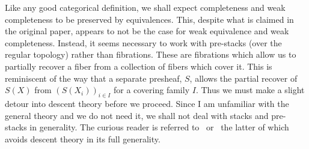 Like any good categorical definition, we shall expect completeness and
weak completeness to be preserved by equivalences. This, despite what
is claimed in the original paper, appears to not be the case for weak
equivalence and weak completeness. Instead, it seems necessary to work
with pre-stacks (over the regular topology) rather than
fibrations. These are fibrations which allow us to partially recover a
fiber from a collection of fibers which cover it. This is reminiscent
of the way that a separate presheaf, $S$, allows the partial recover
of $S(X)$ from $(S(X_i))_{i \in I}$ for a covering family $I$. Thus we
must make a slight detour into descent theory before we proceed. Since
I am unfamiliar with the general theory and we do not need it, we
shall not deal with stacks and pre-stacks in generality. The curious
reader is referred to~\citet{Vistoli:04} or~\citet{Frey:14} the latter
of which avoids descent theory in its full generality.

